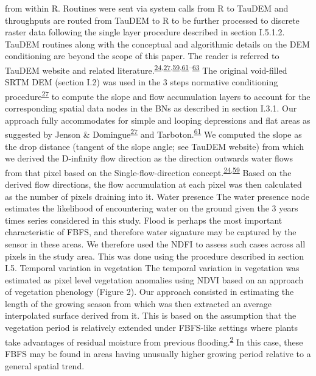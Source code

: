 \documentclass[12pt,oneside]{article}
\begin{document}
from within R. Routines were sent via system calls from R to TauDEM and
throughputs are routed from TauDEM to R to be further processed to
discrete raster data following the single layer procedure described in
section I.5.1.2. TauDEM routines along with the conceptual and
algorithmic details on the DEM conditioning are beyond the scope of this
paper. The reader is referred to TauDEM website and related
literature.\textsuperscript{\protect\hyperlink{ref-Arge_et_al_2003}{24},\protect\hyperlink{ref-Jenson_and_Domingue_1988}{27},\protect\hyperlink{ref-Tarboton_1997}{59},\protect\hyperlink{ref-Tarboton_et_al_1991}{61}--\protect\hyperlink{ref-Wallis_et_al_2009}{63}}
The original void-filled SRTM DEM (section I.2) was used in the 3 steps
normative conditioning
procedure\textsuperscript{\protect\hyperlink{ref-Jenson_and_Domingue_1988}{27}}
to compute the slope and flow accumulation layers to account for the
corresponding spatial data nodes in the BNs as described in section
I.3.1. Our approach fully accommodates for simple and looping
depressions and flat areas as suggested by Jenson \&
Domingue\textsuperscript{\protect\hyperlink{ref-Jenson_and_Domingue_1988}{27}}
and
Tarboton.\textsuperscript{\protect\hyperlink{ref-Tarboton_et_al_1991}{61}}
We computed the slope as the drop distance (tangent of the slope angle;
see TauDEM website) from which we derived the D-infinity flow direction
as the direction outwards water flows from that pixel based on the
Single-ﬂow-direction
concept.\textsuperscript{\protect\hyperlink{ref-Arge_et_al_2003}{24},\protect\hyperlink{ref-Tarboton_1997}{59}}
Based on the derived flow directions, the flow accumulation at each
pixel was then calculated as the number of pixels draining into it.
Water presence The water presence node estimates the likelihood of
encountering water on the ground given the 3 years times series
considered in this study. Flood is perhaps the most important
characteristic of FBFS, and therefore water signature may be captured by
the sensor in these areas. We therefore used the NDFI to assess such
cases across all pixels in the study area. This was done using the
procedure described in section I.5. Temporal variation in vegetation The
temporal variation in vegetation was estimated as pixel level vegetation
anomalies using NDVI based on an approach of vegetation phenology
(Figure 2). Our approach consisted in estimating the length of the
growing season from which was then extracted an average interpolated
surface derived from it. This is based on the assumption that the
vegetation period is relatively extended under FBFS-like settings where
plants take advantages of residual moisture from previous
flooding.\textsuperscript{\protect\hyperlink{ref-VanSteenbergen_et_al_2010}{2}}
In this case, these FBFS may be found in areas having unusually higher
growing period relative to a general spatial trend.
\end{document}
